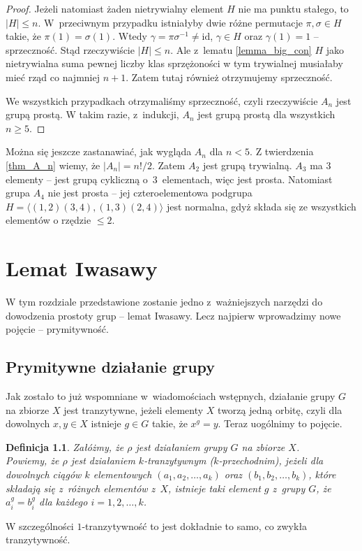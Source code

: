 \documentclass[licencjacka]{pracamgr}
\newtheorem{deff}{Definicja}[section]
\begin{document}
\begin{proof}
    Jeżeli natomiast żaden nietrywialny element $H$ nie ma punktu stałego, to $|H| \le n$.
    W~przeciwnym przypadku istniałyby dwie różne permutacje $\pi, \sigma \in H$ takie, że $\pi(1) = \sigma(1)$.
    Wtedy $\gamma = \pi \sigma ^{-1} \ne \mathrm{id}$, $\gamma \in H$ oraz $\gamma(1) = 1$ -- sprzeczność.
    Stąd rzeczywiście $|H| \le n$.
    Ale z~lematu \ref{lemma_big_con} $H$ jako nietrywialna suma pewnej liczby klas sprzężoności w tym trywialnej musiałaby mieć rząd co najmniej $n+1$.
    Zatem tutaj również otrzymujemy sprzeczność.

    We wszystkich przypadkach otrzymaliśmy sprzeczność, czyli rzeczywiście $A_n$ jest grupą prostą.
    W takim razie, z~indukcji, $A_n$ jest grupą prostą dla wszystkich $n \ge 5$.
\end{proof}

Można się jeszcze zastanawiać, jak wygląda $A_n$ dla $n < 5$. Z
twierdzenia \ref{thm_A_n} wiemy, że $|A_n| = n!/2$. Zatem $A_2$ jest
grupą trywialną. $A_3$ ma
3 elementy -- jest grupą cykliczną o~3~elementach, więc jest prosta.
Natomiast grupa $A_4$ nie jest prosta -- jej czteroelementowa
podgrupa $H = \langle (1,2)(3,4), (1,3)(2,4) \rangle$ jest normalna,
gdyż składa się ze wszystkich elementów o rzędzie $\le 2$.



\chapter{Lemat Iwasawy}
W tym rozdziale przedstawione zostanie jedno z~ważniejszych narzędzi
do dowodzenia prostoty grup -- lemat Iwasawy. Lecz najpierw
wprowadzimy nowe pojęcie --  prymitywność.

\section{Prymitywne działanie grupy}
Jak zostało to już wspomniane w~wiadomościach wstępnych, działanie
grupy $G$ na zbiorze $X$ jest tranzytywne, jeżeli elementy $X$
tworzą jedną orbitę, czyli dla dowolnych $x, y \in X$ istnieje $g
\in G$ takie, że $x^g = y$. Teraz uogólnimy to pojęcie.

\begin{deff}
    Załóżmy, że $\rho$ jest działaniem grupy $G$ na zbiorze $X$. \\
    Powiemy, że $\rho$ jest \emph{działaniem $k$-tranzytywnym ($k$-przechodnim)},
    jeżeli dla dowolnych ciągów $k$ elementowych $(a_1, a_2, \ldots, a_k)$ oraz $(b_1, b_2, \ldots, b_k)$,
    które składają się z~różnych elementów z~$X$, istnieje taki element $g$ z~grupy $G$, że
    $a_i^g = b_i^g$ dla każdego $i = 1, 2, \ldots, k$.
\end{deff}
W szczególności $1$-tranzytywność to jest dokładnie to samo, co
zwykła tranzytywność.
\end{document}
